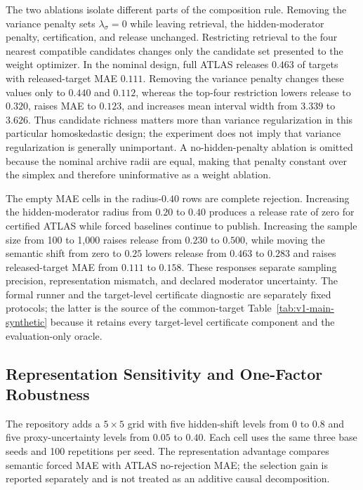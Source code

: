 \documentclass[11pt]{article}
\numberwithin{equation}{section}
\newcommand{\1}{\mathbf 1}
\begin{document}
The two ablations isolate different parts of the composition rule.  Removing the variance penalty sets $\lambda_\sigma=0$ while leaving retrieval, the hidden-moderator penalty, certification, and release unchanged.  Restricting retrieval to the four nearest compatible candidates changes only the candidate set presented to the weight optimizer.  In the nominal design, full ATLAS releases $0.463$ of targets with released-target MAE $0.111$.  Removing the variance penalty changes these values only to $0.440$ and $0.112$, whereas the top-four restriction lowers release to $0.320$, raises MAE to $0.123$, and increases mean interval width from $3.339$ to $3.626$.  Thus candidate richness matters more than variance regularization in this particular homoskedastic design; the experiment does not imply that variance regularization is generally unimportant.  A no-hidden-penalty ablation is omitted because the nominal archive radii are equal, making that penalty constant over the simplex and therefore uninformative as a weight ablation.

The empty MAE cells in the radius-$0.40$ rows are complete rejection.  Increasing the hidden-moderator radius from $0.20$ to $0.40$ produces a release rate of zero for certified ATLAS while forced baselines continue to publish.  Increasing the sample size from 100 to 1,000 raises release from $0.230$ to $0.500$, while moving the semantic shift from zero to $0.25$ lowers release from $0.463$ to $0.283$ and raises released-target MAE from $0.111$ to $0.158$.  These responses separate sampling precision, representation mismatch, and declared moderator uncertainty.  The formal runner and the target-level certificate diagnostic are separately fixed protocols; the latter is the source of the common-target Table~\ref{tab:v1-main-synthetic} because it retains every target-level certificate component and the evaluation-only oracle.


\subsection{Representation Sensitivity and One-Factor Robustness}
\label{app:representation-sensitivity}
\suppressfloats[t]

The repository adds a $5\times5$ grid with five hidden-shift levels from $0$ to $0.8$ and five proxy-uncertainty levels from $0.05$ to $0.40$.  Each cell uses the same three base seeds and 100 repetitions per seed.  The representation advantage compares semantic forced MAE with ATLAS no-rejection MAE; the selection gain is reported separately and is not treated as an additive causal decomposition.
\end{document}
